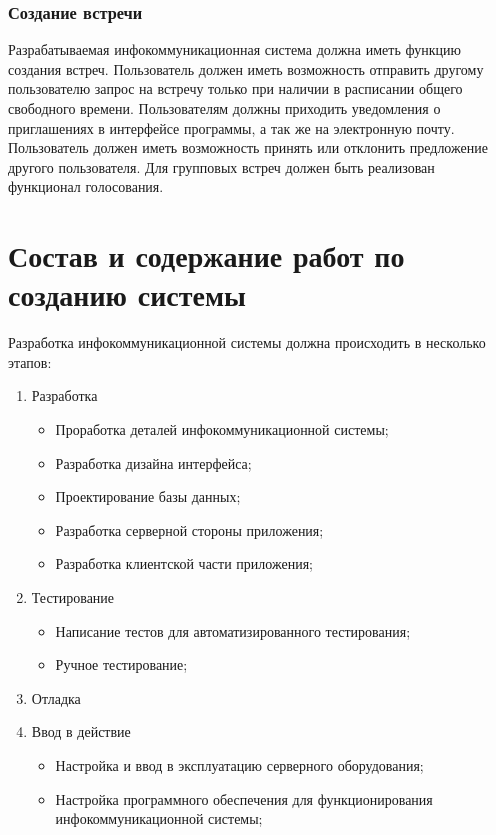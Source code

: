 \documentclass[14pt]{extreport}
\begin{document}
            \subsection{Создание встречи}

                Разрабатываемая инфокоммуникационная система должна иметь функцию создания встреч. Пользователь должен иметь возможность отправить другому пользователю запрос на встречу только при наличии в расписании общего свободного времени. Пользователям должны приходить уведомления о приглашениях в интерфейсе программы, а так же на электронную почту. Пользователь должен иметь возможность принять или отклонить предложение другого пользователя. Для групповых встреч должен быть реализован функционал голосования. 



\chapter{Состав и содержание работ по созданию системы}

        Разработка инфокоммуникационной системы должна происходить в несколько этапов:
        \begin{enumerate}
            \item Разработка \begin{itemize}
                \item Проработка деталей инфокоммуникационной системы;
                \item Разработка дизайна интерфейса;
                \item Проектирование базы данных;
                \item Разработка серверной стороны приложения; 
                \item Разработка клиентской части приложения;
            \end{itemize}
            \item Тестирование \begin{itemize}
                \item Написание тестов для автоматизированного тестирования;
                \item Ручное тестирование;
            \end{itemize}
            \item Отладка 
            \item Ввод в действие \begin{itemize}
                \item Настройка и ввод в эксплуатацию серверного оборудования;
                \item Настройка программного обеспечения для функционирования инфокоммуникационной системы;
            \end{itemize}
        \end{enumerate}
\end{document}
